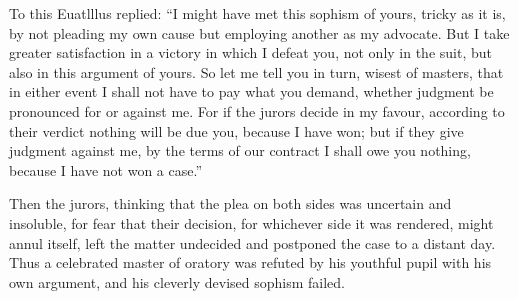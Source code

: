To this Euatlllus replied: ``I might have met this sophism of yours,
tricky as it is, by not pleading my own cause but employing another as
my advocate. But I take greater satisfaction in a victory in which
 I defeat you, not only in the suit, but also in this
argument of yours. So let me tell you in turn, wisest of masters, that
in either event I shall not have to pay what you demand, whether
judgment be pronounced for or against me. For if the jurors decide in
my favour, according to their verdict nothing will be due you, because
I have won; but if they give judgment against me, by the terms of our
contract I shall owe you nothing, because I have not won a case.''

Then the jurors, thinking that the plea on both sides was uncertain
and insoluble, for fear that their decision, for whichever side it was
rendered, might annul itself, left the matter undecided and postponed
the case to a distant day. Thus a celebrated master of oratory was
refuted by his youthful pupil with his own argument, and his cleverly
devised sophism failed.

